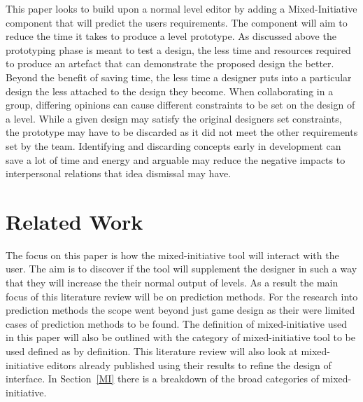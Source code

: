 \documentclass[journal]{IEEEtran}
\begin{document}
This paper looks to build upon  a normal level editor by adding a Mixed-Initiative component that will predict the users requirements. The component will aim to reduce the time it takes to produce a level prototype. As discussed above the prototyping phase is meant to test a design, the less time and resources required to produce an artefact that can demonstrate the proposed design the better. Beyond the benefit of saving time, the less time a designer puts into a particular design the less attached to the design they become. When collaborating in a group, differing opinions can cause different constraints to be set on the design of a level. While a given design may satisfy the original designers set constraints, the prototype may have to be discarded as it did not meet the other requirements set by the team. Identifying and discarding concepts early in development can save a lot of time and energy \cite[p.489]{stempfle1999thinking} and arguable may reduce the negative impacts to interpersonal relations that idea dismissal may have. 

\section{Related Work}
The focus on this paper is how the  mixed-initiative tool will interact with the user. The aim is to discover if the tool will supplement the designer in such a way that they will increase the their normal output of levels. As a result the main focus of this literature review will be on prediction methods. For the research into prediction methods the scope went beyond just game design as their were limited cases of prediction methods to be found. The definition of mixed-initiative used in this paper will also be outlined with the category of mixed-initiative tool to be used defined as by \cite{liapis2016mixed} definition. This literature review will also look at mixed-initiative editors already published using their results to refine the design of interface. In Section~\ref{MI} there is a breakdown of the broad categories of mixed-initiative. 
\end{document}
